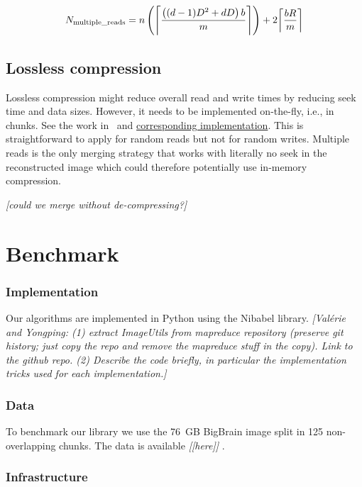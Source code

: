 \documentclass[10pt, conference, compsocconf]{IEEEtran}
\DeclarePairedDelimiter{\ceil}{\lceil}{\rceil}
\newcommand{\todo}[1]{
  \color{red}\emph{[#1]}
  \color{black}
}
\begin{document}
\begin{equation}
  N_\mathrm{multiple\_reads}= n\left( \ceil*{\frac{\left((d-1)D^2+dD\right)b}{m}}\right) + 2\ceil*{\frac{bR}{m}}
\end{equation}

\subsection{Lossless compression}
     
Lossless compression might reduce overall read and write times by
reducing seek time and data sizes. However, it needs to be implemented
on-the-fly, i.e., in chunks. See the work in~\cite{rajna2015speeding}
and
\href{https://github.com/pauldmccarthy/indexed\_gzip}{corresponding
  implementation}. This is straightforward to apply for random reads
but not for random writes. Multiple reads is the only merging strategy
that works with literally no seek in the reconstructed image which
could therefore potentially use in-memory compression.

\todo{could we merge without de-compressing?}

\section{Benchmark}
\label{sec:benchmark}

\subsubsection{Implementation}

Our algorithms are implemented in Python using the Nibabel
library. \todo{Val\'erie and Yongping: (1) extract ImageUtils from
  mapreduce repository (preserve git history; just copy the repo and
  remove the mapreduce stuff in the copy). Link to the github
  repo. (2) Describe the code briefly, in particular the
  implementation tricks used for each implementation.}

\subsubsection{Data}
To benchmark our library we use the 76~GB BigBrain image split in 125
non-overlapping chunks. The data is available \todo{[here]}.

\subsubsection{Infrastructure}
\end{document}
